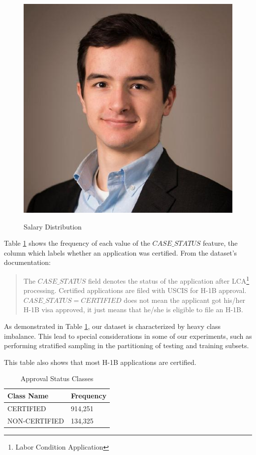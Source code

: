 \documentclass[sigconf]{acmart}
\begin{document}
\begin{figure}[h]
    \caption{Salary Distribution}
    \includegraphics[scale=.4]{salary.png}
    \label{fig:salary}
\end{figure}

Table \ref{tab:classes} shows the frequency of each value of the $CASE\_STATUS$ feature,
the column which labels whether an application was certified. From the dataset's documentation:

\begin{quote}
The $CASE\_STATUS$ field denotes the status of the application after LCA\footnote{Labor Condition
Application} processing. Certified applications are filed with USCIS for H-1B approval.
$CASE\_STATUS = CERTIFIED$ does not mean the applicant got his/her H-1B visa approved, it just
means that he/she is eligible to file an H-1B.
\end{quote}

As demonstrated in Table \ref{tab:classes}, our dataset is characterized by heavy class
imbalance. This lead to special considerations in some of our experiments, such as performing
stratified sampling in the partitioning of testing and training subsets.

This table also shows that most H-1B applications are certified.

\begin{table}[h]
	\caption{Approval Status Classes}
    \begin{tabular}{l l}
        Class Name &Frequency \\
        \hline
        CERTIFIED       & 914,251 \\
        NON-CERTIFIED   & 134,325\\
    \end{tabular}
    \label{tab:classes}
\end{table}
\end{document}
